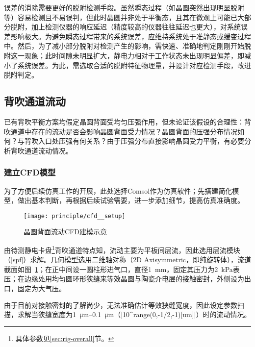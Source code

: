 误差的消除需要更好的脱附检测手段。虽然瞬态过程（如晶圆突然出现明显脱附等）容易检测且不易误判，但此时晶圆并非处于平衡态，且其在微观上可能已大部分脱附，加上检测仪器的响应延迟（精度较高的仪器往往延迟也更大），对系统误差影响极大。为避免瞬态过程带来的系统误差，应维持系统处于准静态或缓变过程中。然后，为了减小部分脱附对检测产生的影响，需快速、准确地判定刚刚开始脱附这一现象；此时间隙未明显扩大，静电力相对于工作状态未出现明显偏差，即减小了系统误差。为此，需选取合适的脱附特征物理量，并设计对应检测手段，改进脱附判定。


\subsection{背吹通道流动}\label{sec:principle-prob-flow}

已有背吹平衡方案均假定晶圆背面受均匀压强作用，但未论证该假设的合理性：背吹通道中存在的流动是否会影响晶圆背面受力情况？晶圆背面的压强分布情况如何？与背吹入口处压强有何关系？由于压强分布直接影响晶圆受力平衡，有必要分析背吹通道流动情况。

\subsubsection{建立CFD模型}\label{sec:principle-prob-flow-cfd-setup}

为了方便后续仿真工作的开展，此处选择Comsol作为仿真软件；先搭建简化模型，做出基本判断，再根据后续试验需要，进一步添加细节，提高仿真准确度。

\begin{figure}[tbh]
\centering
\texttt{[image: principle/cfd\_\_setup]}
\caption{晶圆背面流动CFD建模示意}
\label{fig:principle-flow-cfd-setup}
\end{figure}

由待测静电卡盘\footnote{具体参数见\ref{sec:rig-overall}节。}背吹通道特点知，流动主要为平板间层流，因此选用层流模块（\bverb|spf|）求解。几何模型选用二维轴对称（2D Axisymmetric，即纯旋转体），流道截面如图~\ref{fig:principle-flow-cfd-setup}\footnotemark{}；在正中间设一圆柱形进气口，直径\SI{1}{\mm}，固定其压力为\SI{2}{\kPa}表压；在边缘处用均匀圆环形狭缝来等效晶圆与陶瓷介电层的接触密封，外侧设为出口，固定为大气压。


由于目前对接触密封的了解尚少，无法准确估计等效狭缝宽度，因此设定参数扫描，求解当狭缝宽度为\SIrange{1}{0.1}{\um}（\bverb|10^{range(0,-1/2,-1)}[um]|）时的流动情况。

